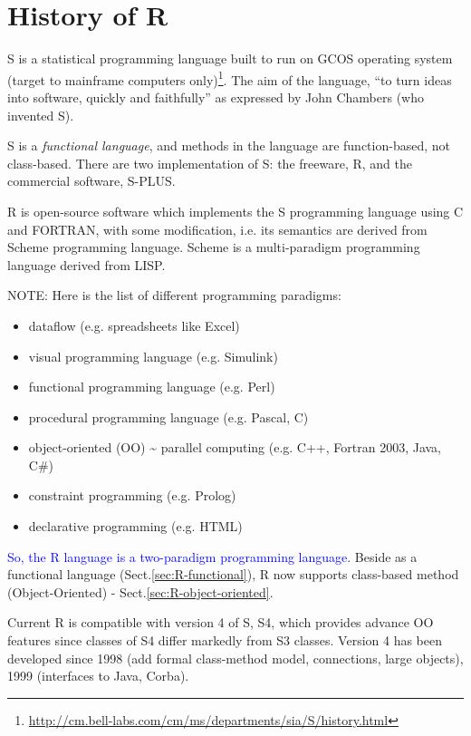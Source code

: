 \section{History of R}
\label{sec:history-r}

S is a statistical programming language built to run on GCOS operating
system (target to mainframe computers
only)\footnote{\url{http://cm.bell-labs.com/cm/ms/departments/sia/S/history.html}}.
The aim of the language, ``to turn ideas into software, quickly and
faithfully'' as expressed by John Chambers (who invented S).

S is a {\it functional language}, and methods in the language are
function-based, not class-based.  There are two implementation of S:
the freeware, R, and the commercial software, S-PLUS.

R is open-source software which implements the S programming language
using C and FORTRAN, with some modification, i.e. its semantics are
derived from Scheme programming language. Scheme is a multi-paradigm
programming language derived from LISP. 

\begin{mdframed}

NOTE: Here is the list of different programming paradigms:

\begin{itemize}
\item dataflow (e.g. spreadsheets like Excel) 
\item visual programming language (e.g. Simulink)
\item functional programming language (e.g. Perl)
\item procedural programming language (e.g. Pascal, C)
\item object-oriented (OO) \~{} parallel computing (e.g. C++, Fortran 2003,
  Java, C\#)
\item constraint programming (e.g. Prolog)
\item declarative programming (e.g. HTML)
\end{itemize}
\end{mdframed}

\textcolor{blue}{So, the R language is a two-paradigm programming
  language}.
Beside as a functional language (Sect.\ref{sec:R-functional}), R now supports
class-based method (Object-Oriented) - Sect.\ref{sec:R-object-oriented}.

Current R is compatible with version 4 of S, S4, which provides
advance OO features since classes of S4 differ markedly from S3
classes. Version 4 has been developed since 1998 (add formal
class-method model, connections, large objects), 1999 (interfaces to
Java, Corba).


